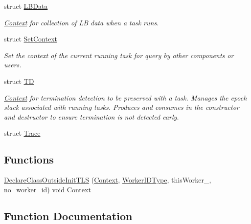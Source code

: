 \begin{DoxyCompactItemize}
struct \hyperlink{structvt_1_1ctx_1_1_l_b_data}{L\+B\+Data}
\begin{DoxyCompactList}\small\item\em \hyperlink{structvt_1_1ctx_1_1_context}{Context} for collection of LB data when a task runs. \end{DoxyCompactList}\item 
struct \hyperlink{structvt_1_1ctx_1_1_set_context}{Set\+Context}
\begin{DoxyCompactList}\small\item\em Set the context of the current running task for query by other components or users. \end{DoxyCompactList}\item 
struct \hyperlink{structvt_1_1ctx_1_1_t_d}{TD}
\begin{DoxyCompactList}\small\item\em \hyperlink{structvt_1_1ctx_1_1_context}{Context} for termination detection to be preserved with a task. Manages the epoch stack associated with running tasks. Produces and consumes in the constructor and destructor to ensure termination is not detected early. \end{DoxyCompactList}\item 
struct \hyperlink{structvt_1_1ctx_1_1_trace}{Trace}
\end{DoxyCompactItemize}
\subsection*{Functions}
\begin{DoxyCompactItemize}
\item 
\hyperlink{namespacevt_1_1ctx_a2b0a82bed85b7c9b0e1c72829319118a}{Declare\+Class\+Outside\+Init\+T\+LS} (\hyperlink{structvt_1_1ctx_1_1_context}{Context}, \hyperlink{namespacevt_a656e362091da17b9b93d0655b36e3392}{Worker\+I\+D\+Type}, this\+Worker\+\_\+, no\+\_\+worker\+\_\+id) void \hyperlink{structvt_1_1ctx_1_1_context}{Context}
\end{DoxyCompactItemize}


\subsection{Function Documentation}
\mbox{\label{namespacevt_1_1ctx_a2b0a82bed85b7c9b0e1c72829319118a}} 
